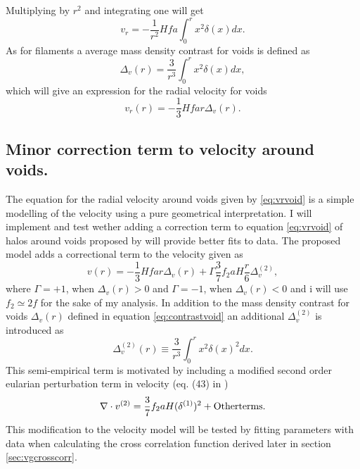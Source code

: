 Multiplying by $r^2$ and integrating one will get
\begin{equation}
    v_r = -\frac{1}{r^2}Hfa\int_0^r x^2\delta(x)dx.
\end{equation}
As for filaments a average mass density contrast for voids is defined as
\begin{equation}\label{eq:contrastvoid}
    \Delta_v(r)=\frac{3}{r^3}\int_0^r x^2\delta(x)dx,
\end{equation}
which will give an expression for the radial velocity for voids
\begin{equation}\label{eq:vrvoid}
    v_r(r)=-\frac{1}{3}Hfar\Delta_v(r).
\end{equation}
\subsection{Minor correction term to velocity around voids.}\label{sec:vr_correction}
The equation for the radial velocity around voids given by \ref{eq:vrvoid} is a simple modelling of the velocity using a pure geometrical interpretation. I will implement and test wether adding a correction term to equation \ref{eq:vrvoid} of halos around voids proposed by \cite{Achitouv} will provide better fits to data. The proposed model adds a correctional term to the velocity given as
\begin{equation}\label{eq:achitouv2017}
    v(r)=-\frac{1}{3}Hfar\Delta_v(r)+\Gamma\frac{3}{7}f_2aH\frac{r}{6}\Delta_v^{(2)},
\end{equation}
where $\Gamma=+1$, when $\Delta_v(r)>0$ and $\Gamma=-1$, when $\Delta_v(r)<0$ and i will use $f_2\simeq 2f$ for the sake of my analysis. In addition to the mass density contrast for voids $\Delta_v(r)$ defined in equation \ref{eq:contrastvoid} an additional $\Delta_v^{(2)}$ is introduced as 
\begin{equation}
    \Delta_v^{(2)}(r)\equiv\frac{3}{r^3}\int_0^rx^2\delta(x)^2dx.
\end{equation}
This semi-empirical term is motivated by including a modified second order eularian perturbation term in velocity (eq. (43) in \cite{Catelan_2ndordervelpert})
\begin{equation}
    \nabla\cdot v^{(2)}=\frac{3}{7}f_2aH(\delta^{(1)})^2+\mathrm{Other} \space\mathrm{terms}.
\end{equation}
This modification to the velocity model will be tested by fitting parameters with data when calculating the cross correlation function derived later in section \ref{sec:vgcrosscorr}.
